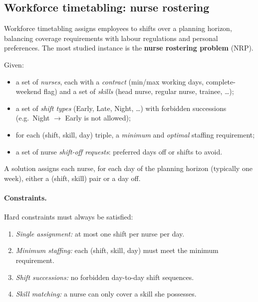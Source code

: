 \subsection{Workforce timetabling: nurse rostering}
\label{ssec:nurse-rostering}

Workforce timetabling assigns employees to shifts over a planning
horizon, balancing coverage requirements with labour regulations
and personal preferences.  The most studied instance is the
\textbf{nurse rostering problem} (NRP).

\begin{definition}
\label{def:nurse-rostering}
Given:
\begin{itemize}[nosep]
  \item a set of \emph{nurses}, each with a \emph{contract}
        (min/max working days, complete-weekend flag) and a set
        of \emph{skills} (head nurse, regular nurse, trainee,
        \ldots);
  \item a set of \emph{shift types} (Early, Late, Night, \ldots)
        with forbidden successions (e.g.\ Night $\to$ Early is
        not allowed);
  \item for each (shift, skill, day) triple, a \emph{minimum}
        and \emph{optimal} staffing requirement;
  \item a set of nurse \emph{shift-off requests}: preferred
        days off or shifts to avoid.
\end{itemize}
A solution assigns each nurse, for each day of the planning
horizon (typically one week), either a (shift, skill) pair or a
day off.
\end{definition}

\paragraph{Constraints.}
Hard constraints must always be satisfied:
\begin{enumerate}[nosep]
  \item[H1.] \emph{Single assignment:} at most one shift per
             nurse per day.
  \item[H2.] \emph{Minimum staffing:} each (shift, skill, day)
             must meet the minimum requirement.
  \item[H3.] \emph{Shift successions:} no forbidden
             day-to-day shift sequences.
  \item[H4.] \emph{Skill matching:} a nurse can only cover a
             skill she possesses.
\end{enumerate}

